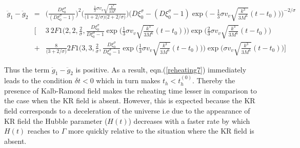 \documentclass[a4paper]{article}
\begin{document}
\begin{eqnarray}
 \ddot{g}_1 - \ddot{g}_2&=&\bigg(\frac{D\xi_0^{\sigma}}{(D\xi_0^{\sigma}-1)}\bigg)^2 \bigg(\frac{\frac{1}{3}\sigma v_v\sqrt{\frac{k^3}{3M^6}}}
 {\big(1+2/\sigma\big)\big(2+2/\sigma\big)}\bigg) 
 \bigg(D\xi_0^{\sigma}-(D\xi_0^{\sigma}-1)\exp{\big(-\frac{1}{3}\sigma v_v\sqrt{\frac{k^3}{3M^6}}(t-t_0)\big)}\bigg)^{-2/\sigma}\nonumber\\
 &\bigg[&3~2F1\bigg(2,2,\frac{2}{\sigma},\frac{D\xi_0^{\sigma}}{D\xi_0^{\sigma}-1}
 \exp{\big(\frac{1}{3}\sigma v_v\sqrt{\frac{k^3}{3M^6}}(t-t_0)\big)}\bigg) 
 \exp{\bigg(\frac{2}{3}\sigma v_v\sqrt{\frac{k^3}{3M^6}}(t-t_0)\bigg)}\nonumber\\ 
 &+&\frac{8}{\big(3+2/\sigma\big)} 2F1\bigg(3,3,\frac{2}{\sigma},\frac{D\xi_0^{\sigma}}{D\xi_0^{\sigma}-1}
 \exp{\big(\frac{1}{3}\sigma v_v\sqrt{\frac{k^3}{3M^6}}(t-t_0)\big)}\bigg) 
 \exp{\bigg(\sigma v_v\sqrt{\frac{k^3}{3M^6}}(t-t_0)\bigg)}\bigg]
 \label{reheating8}
\end{eqnarray}

Thus the term $\ddot{g}_1 - \ddot{g}_2$ is positive. As a result, eqn.(\ref{reheating7}) immediately leads to the condition $\delta t < 0$ which in turn 
makes $t_h < t_h^{(0)}$. Thereby the presence of Kalb-Ramond field makes the reheating time lesser in comparison to the case when the KR field is absent. 
However, this is expected because the KR field corresponds to a deceleration of the universe i.e 
due to the appearance of KR field the Hubble parameter ($H(t)$) decreases with a faster rate by which $H(t)$ reaches to $\Gamma$ more quickly 
relative to the situation where the KR field is absent.
\end{document}
